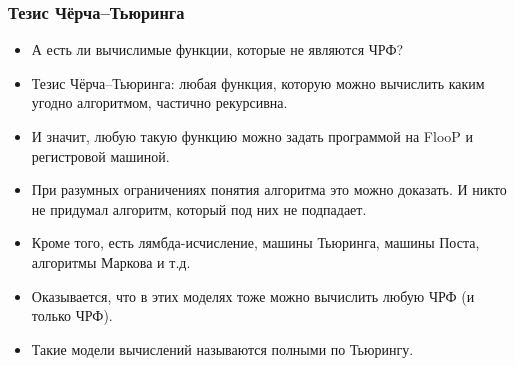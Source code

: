 \documentclass[10pt]{beamer}
\begin{document}
\begin{frame}
    \frametitle{Тезис Чёрча--Тьюринга}
    \begin{itemize}
        \item А есть ли вычислимые функции, которые не являются ЧРФ?
        \pause
        \item Тезис Чёрча--Тьюринга: любая функция, которую можно вычислить каким угодно алгоритмом, частично рекурсивна.
        \item И значит, любую такую функцию можно задать программой на FlooP и регистровой машиной.
        \pause
        \item При разумных ограничениях понятия алгоритма это можно доказать. И никто не придумал алгоритм, который под них не подпадает.
        \pause
        \item Кроме того, есть лямбда-исчисление, машины Тьюринга, машины Поста, алгоритмы Маркова и т.д.
        \item Оказывается, что в этих моделях тоже можно вычислить любую ЧРФ (и только ЧРФ).
        \item Такие модели вычислений называются полными по Тьюрингу.
    \end{itemize}
\end{frame}
\end{document}
